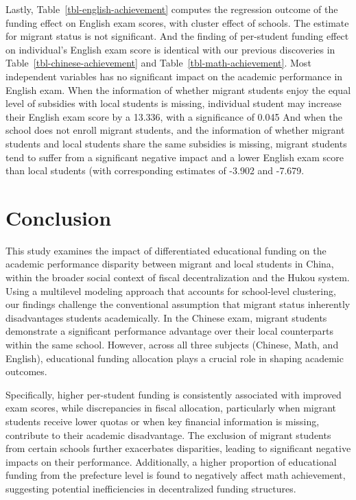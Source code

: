 \documentclass[
  man,
  floatsintext,
  longtable,
  nolmodern,
  notxfonts,
  notimes,
  colorlinks=true,linkcolor=blue,citecolor=blue,urlcolor=blue]{apa7}
\begin{document}
Lastly, Table~\ref{tbl-english-achievement} computes the regression
outcome of the funding effect on English exam scores, with cluster
effect of schools. The estimate for migrant status is not significant.
And the finding of per-student funding effect on individual's English
exam score is identical with our previous discoveries in
Table~\ref{tbl-chinese-achievement} and
Table~\ref{tbl-math-achievement}. Most independent variables has no
significant impact on the academic performance in English exam. When the
information of whether migrant students enjoy the equal level of
subsidies with local students is missing, individual student may
increase their English exam score by a 13.336, with a significance of
0.045 And when the school does not enroll migrant students, and the
information of whether migrant students and local students share the
same subsidies is missing, migrant students tend to suffer from a
significant negative impact and a lower English exam score than local
students (with corresponding estimates of -3.902 and -7.679.

\section{Conclusion}\label{conclusion}

This study examines the impact of differentiated educational funding on
the academic performance disparity between migrant and local students in
China, within the broader social context of fiscal decentralization and
the Hukou system. Using a multilevel modeling approach that accounts for
school-level clustering, our findings challenge the conventional
assumption that migrant status inherently disadvantages students
academically. In the Chinese exam, migrant students demonstrate a
significant performance advantage over their local counterparts within
the same school. However, across all three subjects (Chinese, Math, and
English), educational funding allocation plays a crucial role in shaping
academic outcomes.

Specifically, higher per-student funding is consistently associated with
improved exam scores, while discrepancies in fiscal allocation,
particularly when migrant students receive lower quotas or when key
financial information is missing, contribute to their academic
disadvantage. The exclusion of migrant students from certain schools
further exacerbates disparities, leading to significant negative impacts
on their performance. Additionally, a higher proportion of educational
funding from the prefecture level is found to negatively affect math
achievement, suggesting potential inefficiencies in decentralized
funding structures.
\end{document}
